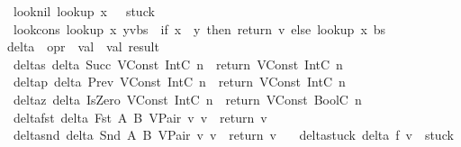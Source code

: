\begin{isabellebody}
\ \ looknil{\isacharcolon}\ {\isachardoublequoteopen}lookup\ x\ {\isacharbrackleft}{\isacharbrackright}\ {\isacharequal}\ stuck{\isachardoublequoteclose}\ {\isacharbar}\isanewline
\ \ lookcons{\isacharcolon}\ {\isachardoublequoteopen}lookup\ x\ {\isacharparenleft}{\isacharparenleft}y{\isacharcomma}v{\isacharparenright}{\isacharhash}bs{\isacharparenright}\ {\isacharequal}\ {\isacharparenleft}if\ x\ {\isacharequal}\ y\ then\ return\ v\ else\ lookup\ x\ bs{\isacharparenright}{\isachardoublequoteclose}\isanewline
\isanewline
{}\isamarkupfalse \ delta\ {\isacharcolon}{\isacharcolon}\ {\isachardoublequoteopen}opr\ {\isasymRightarrow}\ val\ {\isasymRightarrow}\ val\ result{\isachardoublequoteclose}\ \isanewline
\ \ deltas{\isacharcolon}\ {\isachardoublequoteopen}delta\ Succ\ {\isacharparenleft}VConst\ {\isacharparenleft}IntC\ n{\isacharparenright}{\isacharparenright}\ {\isacharequal}\ return\ {\isacharparenleft}VConst\ {\isacharparenleft}IntC\ {\isacharparenleft}n\ {\isacharplus}\ {}{\isacharparenright}{\isacharparenright}{\isacharparenright}{\isachardoublequoteclose}\ {\isacharbar}\isanewline
\ \ deltap{\isacharcolon}\ {\isachardoublequoteopen}delta\ Prev\ {\isacharparenleft}VConst\ {\isacharparenleft}IntC\ n{\isacharparenright}{\isacharparenright}\ {\isacharequal}\ return\ {\isacharparenleft}VConst\ {\isacharparenleft}IntC\ {\isacharparenleft}n\ {\isacharminus}\ {}{\isacharparenright}{\isacharparenright}{\isacharparenright}{\isachardoublequoteclose}\ {\isacharbar}\isanewline
\ \ deltaz{\isacharcolon}\ {\isachardoublequoteopen}delta\ IsZero\ {\isacharparenleft}VConst\ {\isacharparenleft}IntC\ n{\isacharparenright}{\isacharparenright}\ {\isacharequal}\ return\ {\isacharparenleft}VConst\ {\isacharparenleft}BoolC\ {\isacharparenleft}n\ {\isacharequal}\ {}{\isacharparenright}{\isacharparenright}{\isacharparenright}{\isachardoublequoteclose}\ {\isacharbar}\isanewline
\ \ deltafst{\isacharcolon}\ {\isachardoublequoteopen}delta\ {\isacharparenleft}Fst\ A\ B{\isacharparenright}\ {\isacharparenleft}VPair\ v\ v{\isacharprime}{\isacharparenright}\ {\isacharequal}\ return\ v{\isachardoublequoteclose}\ {\isacharbar}\isanewline
\ \ deltasnd{\isacharcolon}\ {\isachardoublequoteopen}delta\ {\isacharparenleft}Snd\ A\ B{\isacharparenright}\ {\isacharparenleft}VPair\ v\ v{\isacharprime}{\isacharparenright}\ {\isacharequal}\ return\ v{\isacharprime}{\isachardoublequoteclose}\ {\isacharbar}\isanewline
\ \ deltastuck{\isacharcolon}\ {\isachardoublequoteopen}delta\ f\ v\ {\isacharequal}\ stuck{\isachardoublequoteclose}\isanewline

\end{isabellebody}
